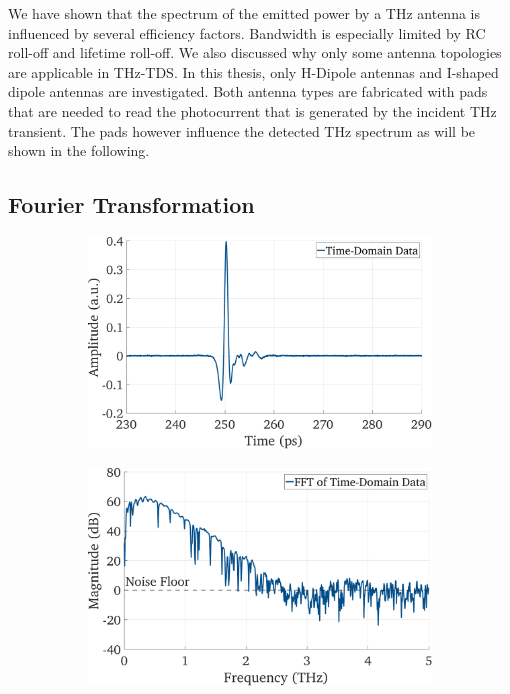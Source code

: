 We have shown that the spectrum of the emitted power by a THz antenna is influenced by several efficiency factors. Bandwidth is especially limited by RC roll-off and lifetime roll-off. We also discussed why only some antenna topologies are applicable in THz-TDS. In this thesis, only H-Dipole antennas and I-shaped dipole antennas are investigated. Both antenna types are fabricated with pads that are needed to read the photocurrent that is generated by the incident THz transient. The pads however influence the detected THz spectrum as will be shown in the following. 

\subsection{Fourier Transformation}


\begin{figure}[!]
    \centering
    \begin{minipage}{\textwidth} 
        \centering
        \begin{subfigure}[t]{0.48\textwidth}
            \centering
            \includegraphics[height=0.235\textheight]{figures/theory/time_domain.pdf}
            \caption{\centering}
            \label{fgdhsjk}
        \end{subfigure}
        \hfill
        \begin{subfigure}[t]{0.48\textwidth}
            \centering
            \includegraphics[height=0.235\textheight]{figures/theory/spectrum.pdf}

\end{subfigure}
\end{minipage}
\end{figure}
